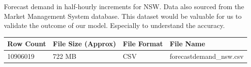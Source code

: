 \documentclass[mstat,12pt]{unswthesis}
\begin{document}
Forecast demand in half-hourly increments for NSW. Data also sourced
from the Market Management System database. This dataset would be
valuable for us to validate the outcome of our model. Especially to
understand the accuracy.

\begin{table}[h]
\tiny
\begin{tabular}{@{}|l|l|l|l|@{}}
\toprule
\rowcolor[HTML]{EFEFEF} 
\textbf{Row Count} & \textbf{File Size (Approx)} & \textbf{File Format} & \textbf{File Name}      \\ \midrule
10906019           & 722 MB                      & CSV                  & forecastdemand\_nsw.csv \\ \bottomrule
\end{tabular}
\end{table}
\end{document}
